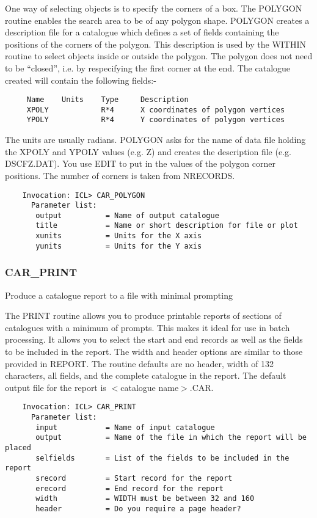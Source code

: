 One way of selecting objects is to specify the corners of a box.
The POLYGON routine enables the search area to be of any polygon shape.
POLYGON creates a description file for a catalogue which
defines a set of fields containing the positions of the corners of the
polygon.
This description is used by the WITHIN routine to select objects
inside or outside the polygon.
The polygon does not need to be ``closed'', i.e. by respecifying the first
corner at the end.
The catalogue created will contain the following fields:-
\begin{verbatim}
     Name    Units    Type     Description
     XPOLY            R*4      X coordinates of polygon vertices
     YPOLY            R*4      Y coordinates of polygon vertices
\end{verbatim}
The units are usually radians.
POLYGON asks for the name of data file holding the XPOLY and YPOLY values
(e.g. Z) and creates the description file (e.g. DSCFZ.DAT).
You use EDIT to put in the values of the polygon corner positions.
The number of corners is taken from NRECORDS.
\begin{verbatim}
    Invocation: ICL> CAR_POLYGON
      Parameter list:
       output          = Name of output catalogue
       title           = Name or short description for file or plot
       xunits          = Units for the X axis
       yunits          = Units for the Y axis
\end{verbatim}

\subsubsection{CAR\_PRINT}

Produce a catalogue report to a file with minimal prompting

The PRINT routine allows you to produce printable reports of sections of
catalogues with a minimum of prompts.
This makes it ideal for use in batch processing.
It allows you to select the start and end records as well as the fields to be
included in the report.
The width and header options are similar to those provided in REPORT.
The routine defaults are no header, width of 132 characters, all fields,
and the complete catalogue in the report.
The default output file for the report is $<$catalogue name$>$.CAR.

\begin{verbatim}
    Invocation: ICL> CAR_PRINT
      Parameter list:
       input           = Name of input catalogue
       output          = Name of the file in which the report will be placed
       selfields       = List of the fields to be included in the report
       srecord         = Start record for the report
       erecord         = End record for the report
       width           = WIDTH must be between 32 and 160
       header          = Do you require a page header?
\end{verbatim}

